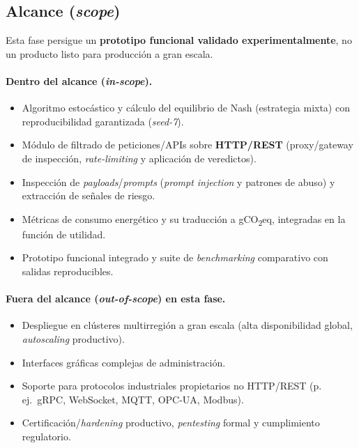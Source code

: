 \documentclass[10pt,twocolumn]{article}
\begin{document}
\subsection{Alcance (\emph{scope})}
Esta fase persigue un \textbf{prototipo funcional validado experimentalmente}, no un
producto listo para producci\'on a gran escala.

\paragraph{Dentro del alcance (\emph{in-scope}).}
\begin{itemize}\itemsep2pt
  \item Algoritmo estoc\'astico y c\'alculo del equilibrio de Nash (estrategia mixta)
        con reproducibilidad garantizada (\emph{seed-7}).
  \item M\'odulo de filtrado de peticiones/APIs sobre \textbf{HTTP/REST}
        (proxy/gateway de inspecci\'on, \emph{rate-limiting} y aplicaci\'on de
        veredictos).
  \item Inspecci\'on de \emph{payloads}/\emph{prompts} (\emph{prompt injection} y
        patrones de abuso) y extracci\'on de se\~nales de riesgo.
  \item M\'etricas de consumo energ\'etico y su traducci\'on a
        gCO\textsubscript{2}eq, integradas en la funci\'on de utilidad.
  \item Prototipo funcional integrado y suite de \emph{benchmarking} comparativo con
        salidas reproducibles.
\end{itemize}

\paragraph{Fuera del alcance (\emph{out-of-scope}) en esta fase.}
\begin{itemize}\itemsep2pt
  \item Despliegue en cl\'usteres multirregi\'on a gran escala (alta disponibilidad
        global, \emph{autoscaling} productivo).
  \item Interfaces gr\'aficas complejas de administraci\'on.
  \item Soporte para protocolos industriales propietarios no HTTP/REST (p.\,ej.\
        gRPC, WebSocket, MQTT, OPC-UA, Modbus).
  \item Certificaci\'on/\emph{hardening} productivo, \emph{pentesting} formal y
        cumplimiento regulatorio.
\end{itemize}
\end{document}
